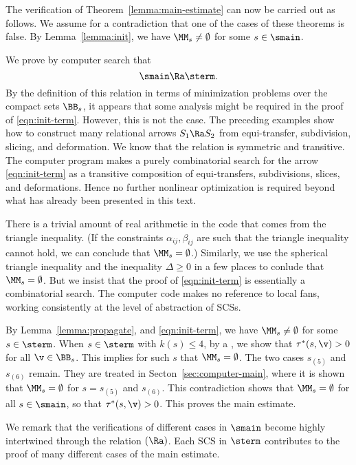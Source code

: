 \begin{remark}
The verification of 
Theorem~\ref{lemma:main-estimate}  can now be
carried out as follows.  We assume for a contradiction that
one of the cases of these theorems is false.  By Lemma~\ref{lemma:init}, we have
$\MM_s\ne\emptyset$ for some $s\in \smain$.  

We prove by computer search
 that 
\begin{equation}\label{eqn:init-term}
\smain\Ra \sterm.
\end{equation}
   By the definition of this
relation in terms of minimization problems over the compact sets
$\BB_s$,
it appears that some analysis might be required in the proof
of \eqref{eqn:init-term}.  However, this is not the case.  The
preceding
examples show how to construct many relational arrows $S_1\Ra S_2$
from equi-transfer, subdivision, slicing, and deformation.
We know that the relation is symmetric and transitive.   The computer
program makes a purely combinatorial search for the arrow
\eqref{eqn:init-term}
as a transitive composition of equi-transfers, subdivisions, slices,
and
deformations.  Hence no further nonlinear optimization is required
beyond
what has already been presented in this text.

There is a trivial amount of real arithmetic in the code that comes
from the triangle inequality.   (If
the constraints $\alpha_{ij},\beta_{ij}$ are such that the triangle
inequality cannot hold, we can conclude that $\MM_s=\emptyset$.)
Similarly, we use the spherical triangle inequality and the inequality
$\Delta\ge0$ in a few places to conlude that $\MM_s=\emptyset$.
But we insist that the proof of \eqref{eqn:init-term} is essentially
a combinatorial search.  The computer code makes no reference
to local fans, working consistently at the level of abstraction of SCSs.


By Lemma~\ref{lemma:propagate}, and \eqref{eqn:init-term}, we have
$\MM_s\ne\emptyset$ for some $s\in \sterm$.  When $s\in \sterm$
with $k(s)\le 4$, by a , we show
that $\tau^*(s,\v) >0$ for all $\v\in \BB_s$.  This implies for such $s$
that $\MM_s=\emptyset$.  The two cases $s_{(5)}$ and $s_{(6)}$ remain.
They are treated in Secton~\ref{sec:computer-main}, where it is shown
that $\MM_s=\emptyset$ for $ s=s_{(5)}$ and $s_{(6)}$.  This
contradiction shows that $\MM_s=\emptyset$ for all $s\in \smain$,
so that $\tau^*(s,\v)>0$.  This proves the main estimate.

We remark that the verifications of  different cases in $\smain$ become
highly intertwined through the relation $(\Ra)$.  Each SCS
 in $\sterm$ contributes to the proof of many different cases
of the main estimate.
\end{remark}